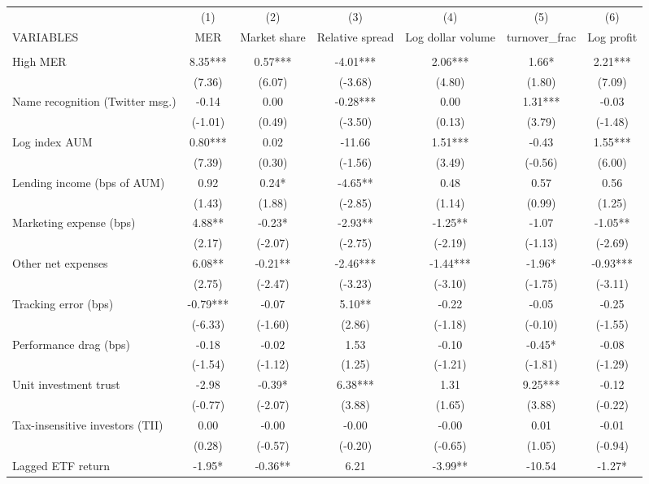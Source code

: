 \documentclass[]{article}
\begin{document}
\begin{tabular}{lcccccc} \hline
 & (1) & (2) & (3) & (4) & (5) & (6) \\
VARIABLES & MER & Market share & Relative spread & Log dollar volume & turnover\_frac & Log profit \\ \hline
 &  &  &  &  &  &  \\
High MER & 8.35*** & 0.57*** & -4.01*** & 2.06*** & 1.66* & 2.21*** \\
 & (7.36) & (6.07) & (-3.68) & (4.80) & (1.80) & (7.09) \\
Name recognition (Twitter msg.) & -0.14 & 0.00 & -0.28*** & 0.00 & 1.31*** & -0.03 \\
 & (-1.01) & (0.49) & (-3.50) & (0.13) & (3.79) & (-1.48) \\
Log index AUM & 0.80*** & 0.02 & -11.66 & 1.51*** & -0.43 & 1.55*** \\
 & (7.39) & (0.30) & (-1.56) & (3.49) & (-0.56) & (6.00) \\
Lending income (bps of AUM) & 0.92 & 0.24* & -4.65** & 0.48 & 0.57 & 0.56 \\
 & (1.43) & (1.88) & (-2.85) & (1.14) & (0.99) & (1.25) \\
Marketing expense (bps) & 4.88** & -0.23* & -2.93** & -1.25** & -1.07 & -1.05** \\
 & (2.17) & (-2.07) & (-2.75) & (-2.19) & (-1.13) & (-2.69) \\
Other net expenses & 6.08** & -0.21** & -2.46*** & -1.44*** & -1.96* & -0.93*** \\
 & (2.75) & (-2.47) & (-3.23) & (-3.10) & (-1.75) & (-3.11) \\
Tracking error (bps) & -0.79*** & -0.07 & 5.10** & -0.22 & -0.05 & -0.25 \\
 & (-6.33) & (-1.60) & (2.86) & (-1.18) & (-0.10) & (-1.55) \\
Performance drag (bps) & -0.18 & -0.02 & 1.53 & -0.10 & -0.45* & -0.08 \\
 & (-1.54) & (-1.12) & (1.25) & (-1.21) & (-1.81) & (-1.29) \\
Unit investment trust & -2.98 & -0.39* & 6.38*** & 1.31 & 9.25*** & -0.12 \\
 & (-0.77) & (-2.07) & (3.88) & (1.65) & (3.88) & (-0.22) \\
Tax-insensitive investors (TII) & 0.00 & -0.00 & -0.00 & -0.00 & 0.01 & -0.01 \\
 & (0.28) & (-0.57) & (-0.20) & (-0.65) & (1.05) & (-0.94) \\
Lagged ETF return & -1.95* & -0.36** & 6.21 & -3.99** & -10.54 & -1.27* \\

\end{tabular}
\end{document}
